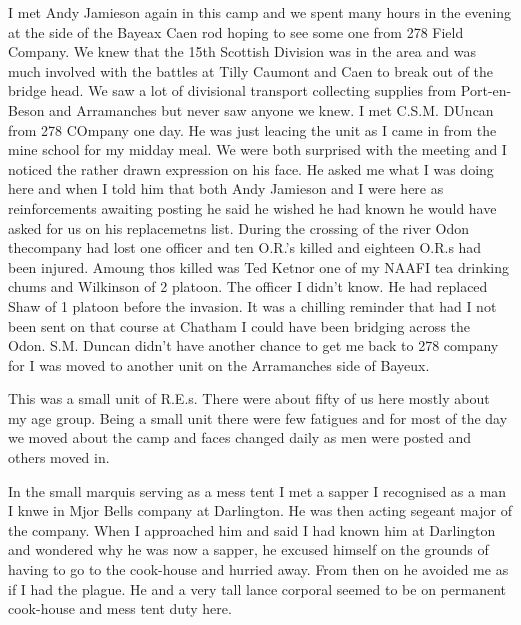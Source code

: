 I met Andy Jamieson again in this camp and we spent many hours in the
evening at the side of the Bayeax Caen rod hoping to see some one from
278 Field Company. We knew that the 15th Scottish Division was in the
area and was much involved with the battles at Tilly Caumont and Caen
to break out of the bridge head. We saw a lot of divisional transport
collecting supplies from Port-en-Beson and Arramanches but never saw
anyone we knew. I met C.S.M. DUncan from 278 COmpany one day. He was
just leacing the unit as I came in from the mine school for my midday
meal. We were both surprised with the meeting and I noticed the rather
drawn expression on his face. He asked me what I was doing here and
when I told him that both Andy Jamieson and I were here as
reinforcements awaiting posting he said he wished he had known he
would have asked for us on his replacemetns list. During the crossing
of the river Odon thecompany had lost one officer and ten O.R.'s
killed and eighteen O.R.s had been injured. Amoung thos killed was Ted
Ketnor one of my NAAFI tea drinking chums and \corporal Wilkinson of 2
platoon. The officer I didn't know. He had replaced \lieutenant Shaw of 1
platoon before the invasion. It was a chilling reminder that had I not
been sent on that course at Chatham I could have been bridging across
the Odon. S.M. Duncan didn't have another chance to get me back to 278
company for I was moved to another unit on the Arramanches side of
Bayeux.

This was a small unit of R.E.s. There were about fifty of us here
mostly about my age group. Being a small unit there were few fatigues
and for most of the day we moved about the camp and faces changed
daily as men were posted and others moved in.

In the small marquis serving as a mess tent I met a sapper I
recognised as a man I knwe in Mjor Bells company at Darlington. He was
then acting segeant major of the company. When I approached him and
said I had known him at Darlington and wondered why he was now a
sapper, he excused himself on the grounds of having to go to the
cook-house and hurried away. From then on he avoided me as if I had
the plague. He and a very tall lance corporal seemed to be on
permanent cook-house and mess tent duty here.

